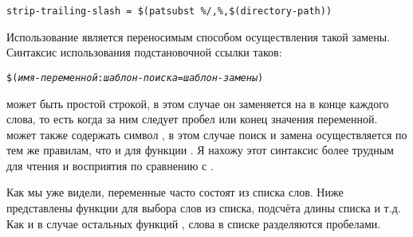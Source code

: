 \begin{description}
{\footnotesize
\begin{verbatim}
strip-trailing-slash = $(patsubst %/,%,$(directory-path))
\end{verbatim}
}

Использование 
является переносимым способом осуществления такой замены. Синтаксис
использования подстановочной ссылки таков:

{\footnotesize
\begin{alltt}
\${}(\emph{имя-переменной}:\emph{шаблон-поиска}=\emph{шаблон-замены})
\end{alltt}
}

 может быть простой строкой, в этом случае
он заменяется на  в конце каждого слова, то
есть когда за ним следует пробел или конец значения переменной.
 может также содержать символ \command{\%},
в этом случае поиск и замена осуществляется по тем же правилам, что и
для функции . Я нахожу этот синтаксис более трудным
для чтения и восприятия по сравнению с .
\end{description}

Как мы уже видели, переменные часто состоят из списка слов. Ниже
представлены функции для выбора слов из списка, подсчёта длины списка
и т.д. Как и в случае остальных функций \GNUmake{}, слова в списке
разделяются пробелами.

